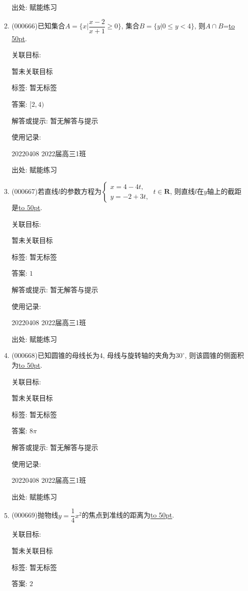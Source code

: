 \documentclass[10pt,a4paper]{article}
\newcommand{\blank}[1]{\underline{\hbox to #1pt{}}}
\begin{document}
\begin{enumerate}[1.]
出处: 赋能练习
\item { (000666)}已知集合$A=\{x|\dfrac{x-2}{x+1}\ge 0\}$, 集合$B=\{y|0 \le y<4\}$, 则$A\cap B$=\blank{50}.


关联目标:

暂未关联目标



标签: 暂无标签

答案: $[2,4)$

解答或提示: 暂无解答与提示

使用记录:

20220408	2022届高三1班	


出处: 赋能练习
\item { (000667)}若直线$l$的参数方程为$\begin{cases} x=4-4t,  \\ y=-2+3t,\end{cases} \  t\in \mathbf{R}$, 则直线$l$在$y$轴上的截距是\blank{50}.


关联目标:

暂未关联目标



标签: 暂无标签

答案: $1$

解答或提示: 暂无解答与提示

使用记录:

20220408	2022届高三1班	


出处: 赋能练习
\item { (000668)}已知圆锥的母线长为$4$, 母线与旋转轴的夹角为$30^\circ$, 则该圆锥的侧面积为\blank{50}.


关联目标:

暂未关联目标



标签: 暂无标签

答案: $8\pi$

解答或提示: 暂无解答与提示

使用记录:

20220408	2022届高三1班	


出处: 赋能练习
\item { (000669)}抛物线$y=\dfrac14{x^2}$的焦点到准线的距离为\blank{50}.


关联目标:

暂未关联目标



标签: 暂无标签

答案: $2$


\end{enumerate}
\end{document}
